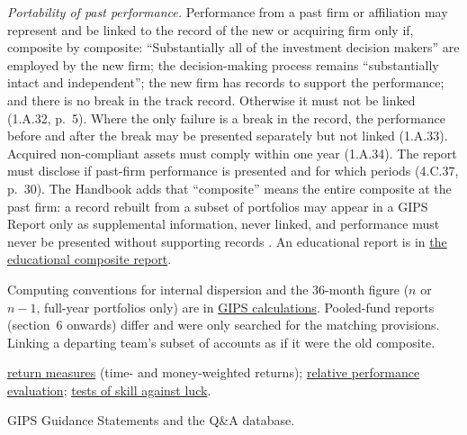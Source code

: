 \begin{qfmethod}
\emph{Portability of past performance.} Performance from a past firm or affiliation may represent and be linked to the record of the new or acquiring firm only if, composite by composite: ``Substantially all of the investment decision makers'' are employed by the new firm; the decision-making process remains ``substantially intact and independent''; the new firm has records to support the performance; and there is no break in the track record. Otherwise it must not be linked (1.A.32, p.~5). Where the only failure is a break in the record, the performance before and after the break may be presented separately but not linked (1.A.33). Acquired non-compliant assets must comply within one year (1.A.34). The report must disclose if past-firm performance is presented and for which periods (4.C.37, p.~30). The Handbook adds that ``composite'' means the entire composite at the past firm: a record rebuilt from a subset of portfolios may appear in a GIPS Report only as supplemental information, never linked, and performance must never be presented without supporting records \citep[Provision 1.A.32, pp.~50--52]{gips-handbook-firms-2020}. An educational report is in \hyperref[ex:gips-composite-report]{the educational composite report}.

 Computing conventions for internal dispersion and the 36-month figure ($n$ or $n-1$, full-year portfolios only) are in \hyperref[meth:gips-return-calculations]{GIPS calculations}. Pooled-fund reports (section~6 onwards) differ and were only searched for the matching provisions. Linking a departing team's subset of accounts as if it were the old composite.

 \hyperref[def:return-measures]{return measures} (time- and money-weighted returns); \hyperref[meth:relative-performance-evaluation]{relative performance evaluation}; \hyperref[meth:skill-luck-significance-tests]{tests of skill against luck}.

 GIPS Guidance Statements and the Q\&A database.

\end{qfmethod}
